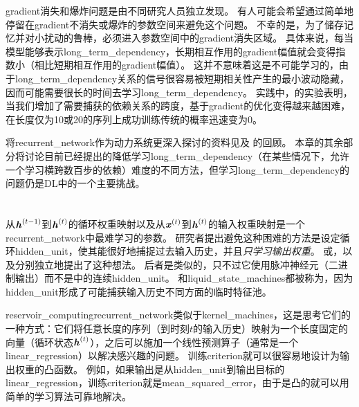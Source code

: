 \gls{gradient}消失和爆炸问题是由不同研究人员独立发现\citep{Hochreiter91-small,Bengio_icnn93,Bengio1994ITNN}。
有人可能会希望通过简单地停留在\gls{gradient}不消失或爆炸的参数空间来避免这个问题。
不幸的是，为了储存记忆并对小扰动的鲁棒，必须进入参数空间中的\gls{gradient}消失区域\citep{Bengio_icnn93,Bengio1994ITNN}。
具体来说，每当模型能够表示\gls{long_term_dependency}，长期相互作用的\gls{gradient}幅值就会变得指数小（相比短期相互作用的\gls{gradient}幅值）。
这并不意味着这是不可能学习的，由于\gls{long_term_dependency}关系的信号很容易被短期相关性产生的最小波动隐藏，因而可能需要很长的时间去学习\gls{long_term_dependency}。
实践中，\cite{Bengio1994ITNN}的实验表明，当我们增加了需要捕获的依赖关系的跨度，基于\gls{gradient}的优化变得越来越困难，在长度仅为10或20的序列上成功训练传统的概率迅速变为0。

将\gls{recurrent_network}作为动力系统更深入探讨的资料见\cite{Doya93,Bengio1994ITNN,Siegelmann+Sontag-1995}及
\cite{Pascanu-et-al-ICML2013}的回顾。
本章的其余部分将讨论目前已经提出的降低学习\gls{long_term_dependency}（在某些情况下，允许一个学习横跨数百步的依赖）难度的不同方法，但学习\gls{long_term_dependency}的问题仍是\gls{DL}中的一个主要挑战。


\section{}
\label{sec:echo_state_networks}
从$\boldsymbol{\mathit{h}}^{(t-1)}$到$\boldsymbol{\mathit{h}}^{(t)}$的循环权重映射以及从$\boldsymbol{\mathit{x}}^{(t)}$到$\boldsymbol{\mathit{h}}^{(t)}$的输入权重映射是一个\gls{recurrent_network}中最难学习的参数。
研究者\citep{Jaeger-NIPS2002,Maass-et-al-2002,Jaeger+Haas-2004}提出避免这种困难的方法是设定循环\gls{hidden_unit}，使其能很好地捕捉过去输入历史，并且\emph{只学习输出权重}。
或\citep{Jaeger+Haas-2004,Jaeger-2007}，以及\citep{Maass-et-al-2002}分别独立地提出了这种想法。
后者是类似的，只不过它使用脉冲神经元（二进制输出）而不是中的连续\gls{hidden_unit}。
和\gls{liquid_state_machines}都被称为\citep{Lukosevicius+Jaeger-2009}，因为\gls{hidden_unit}形成了可能捕获输入历史不同方面的临时特征池。


\gls{reservoir_computing}\gls{recurrent_network}类似于\gls{kernel_machines}，这是思考它们的一种方式：它们将任意长度的序列（到时刻$t$的输入历史）映射为一个长度固定的向量（循环状态$\boldsymbol{\mathit{h}}^{(t)}$），之后可以施加一个线性预测算子（通常是一个\gls{linear_regression}）以解决感兴趣的问题。
训练\gls{criterion}就可以很容易地设计为输出权重的凸函数。
例如，如果输出是从\gls{hidden_unit}到输出目标的\gls{linear_regression}，训练\gls{criterion}就是\gls{mean_squared_error}，由于是凸的就可以用简单的学习算法可靠地解决\citep{Jaeger-NIPS2002}。

